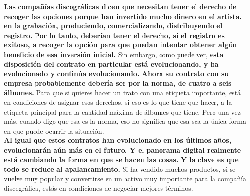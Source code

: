 \documentclass[10pt]{book}
\begin{document}
\textbf{Las compañías discográficas dicen que necesitan tener el derecho de recoger las opciones porque han invertido mucho dinero en el artista, en la grabación, produciendo, comercializando, distribuyendo el registro.} \textbf{Por lo tanto, deberían tener el derecho, si el registro es exitoso, a recoger la opción para que puedan intentar obtener algún beneficio de esa inversión inicial.} Sin embargo, como puede ver, \textbf{esta disposición del contrato en particular está evolucionando, y ha evolucionado y continúa evolucionando. Ahora su contrato con su empresa probablemente debería ser por la norma, de cuatro a seis álbumes.} Para que si quieres hacer un trato con una etiqueta importante, está en condiciones de asignar esos derechos, si eso es lo que tiene que hacer, a la etiqueta principal para la cantidad máxima de álbumes que tiene. Pero una vez más, cuando digo que esa es la norma, eso no significa que esa sea la única forma en que puede ocurrir la situación.\\
\textbf{Al igual que estos contratos han evolucionado en los últimos años, evolucionarán aún más en el futuro. Y el panorama digital realmente está cambiando la forma en que se hacen las cosas. Y la clave es que todo se reduce al apalancamiento.}  Si ha vendido muchos productos, si se vuelve muy popular y convertirse en un activo muy importante para la compañía discográfica, estás en condiciones de negociar mejores términos. \\
\end{document}

